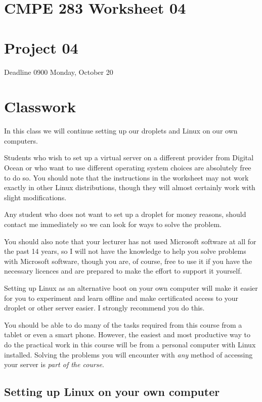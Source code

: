 \documentclass[12pt, a4paper]{article}
\begin{document}

\section*{CMPE 283 Worksheet 04}
\section*{Project 04} 
Deadline 0900 Monday, October 20


\section*{Classwork}
In this class we will continue setting up our droplets and Linux on our own 
computers.

Students who wish to set up a virtual server on a different provider from 
Digital Ocean or who want to use different operating system choices are 
absolutely free to do so. You should note that the instructions in the worksheet may not work exactly in other Linux distributions, though they will almost certainly work with slight modifications.

Any student who does not want to set up a droplet for money reasons, should contact me immediately so we can look for ways to solve the problem. 

You should also note that your lecturer has not used Microsoft software at all for the past 14 years, so I will not have the knowledge to help you solve problems with Microsoft software, though you are, of course, free to use it if you have the necessary licences and are prepared to make the effort to support it yourself. 

Setting up Linux as an alternative boot on your own computer will make it easier for you to experiment and learn offline and make certificated access to your droplet or other server easier. I strongly recommend you do this.

You should be able to do many of the tasks required from this course from a tablet or even a smart phone. However, the easiest and most productive way to do the practical work in this course will be from a personal computer with Linux installed. Solving the problems you will encounter with \emph{any} method of accessing your server is \emph{part of the course}.

\subsection*{Setting up Linux on your own computer}
\end{document}
